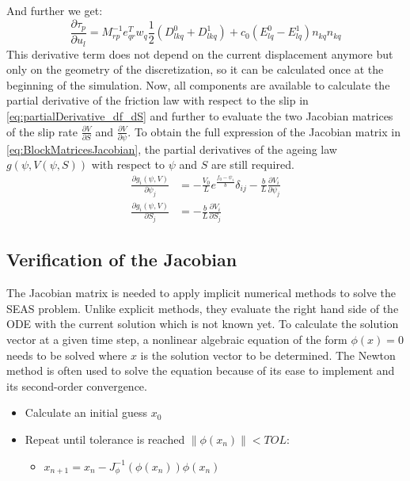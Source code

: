\documentclass{report}
\begin{document}
And further we get: 
\begin{equation}
    \frac{\partial \tau_p}{\partial u_l} = M_{rp}^{-1}e_{qr}^Tw_q
    \frac{1}{2}\left(D_{lkq}^0 + D_{lkq}^1\right) + c_0\left(E_{lq}^0 - E_{lq}^1\right)n_{kq}
    n_{kq} 
\end{equation}
This derivative term does not depend on the current displacement anymore but only on the geometry of the discretization, so it can be calculated once at the beginning of the simulation. Now, all components are available to calculate the partial derivative of the friction law with respect to the slip in \autoref{eq:partialDerivative_df_dS} and further to evaluate the two Jacobian matrices of the slip rate $\frac{\partial V}{\partial S}$ and $\frac{\partial V}{\partial \psi}$. To obtain the full expression of the Jacobian matrix in \autoref{eq:BlockMatricesJacobian}, the partial derivatives of the ageing law $g(\psi, V(\psi,S))$ with respect to $\psi$ and $S$ are still required.
\begin{align}
    \frac{\partial g_i(\psi,V)}{\partial\psi_j} &= -\frac{V_0}{L}e^{\frac{f_0-\psi_i}{b}}\delta_{ij} - \frac{b}{L}\frac{\partial V_i}{\partial \psi_j} \\
    \frac{\partial g_i(\psi,V)}{\partial S_j} &=  - \frac{b}{L}\frac{\partial V_i}{\partial S_j}
\end{align}

\subsection{Verification of the Jacobian}
The Jacobian matrix is needed to apply implicit numerical methods to solve the SEAS problem. Unlike explicit methods, they evaluate the right hand side of the ODE with the current solution which is not known yet. To calculate the solution vector at a given time step, a nonlinear algebraic equation of the form $\phi(x) = 0$ needs to be solved where $x$ is the solution vector to be determined. The Newton method is often used to solve the equation because of its ease to implement and its second-order convergence. 

\begin{itemize}
	\item Calculate an initial guess $x_0$
	\item Repeat until tolerance is reached $\|\phi(x_n)\| < TOL$: 
	\begin{itemize}
		\item $x_{n+1} = x_n - J_\phi^{-1}(\phi(x_n)) \phi(x_n)$
	\end{itemize} 
\end{itemize}
\end{document}
